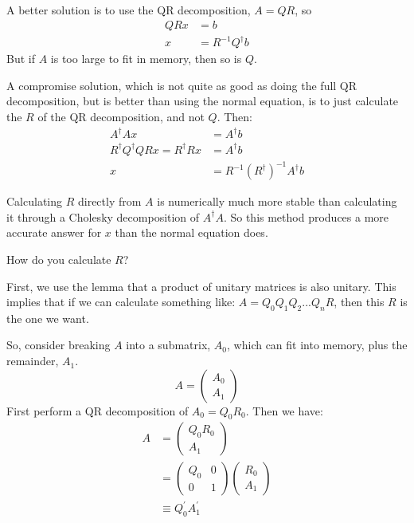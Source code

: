 \documentclass[twoside,letterpaper,11pt]{article}
\begin{document}
A better solution is to use the QR decomposition, $A = QR$, so
\begin{align*}
Q R x &= b \\
x &= R^{-1} Q^\dagger b
\end{align*}
But if $A$ is too large to fit in memory, then so is $Q$.

A compromise solution, which is not quite as good as doing the full QR decomposition,
but is better than using the normal equation, is to just calculate the $R$ of the
QR decomposition, and not $Q$.  Then:
\begin{align*}
A^\dagger A x &= A^\dagger b \\
R^\dagger Q^\dagger Q R x = R^\dagger R x &= A^\dagger b \\
x &= R^{-1} (R^\dagger)^{-1} A^\dagger b
\end{align*}

Calculating $R$ directly from $A$ is numerically much more stable than 
calculating it through a Cholesky decomposition of $A^\dagger A$.
So this method produces a more accurate answer for $x$ than the normal equation does.

How do you calculate $R$?

First, we use the lemma that a product of unitary matrices is also unitary.  
This implies that if we can calculate
something like: $A = Q_0 Q_1 Q_2 ... Q_n R$, then this $R$ is the one we want.

So, consider breaking $A$ into a submatrix, $A_0$, which can fit into memory, 
plus the remainder, $A_1$.
\begin{equation*}
A = \left(\begin{array}{c}A_0 \\A_1\end{array}\right)
\end{equation*}
First perform a QR decomposition of $A_0 = Q_0 R_0$.  Then we have:
\begin{align*}
A &= \left(\begin{array}{c}Q_0 R_0 \\ A_1 \end{array}\right) \\
&= \left(\begin{array}{cc}Q_0 & 0 \\ 0 & 1\end{array}\right) 
      \left(\begin{array}{c}R_0 \\ A_1 \end{array}\right) \\
&\equiv Q_0^\prime A_1^\prime
\end{align*}
\end{document}
